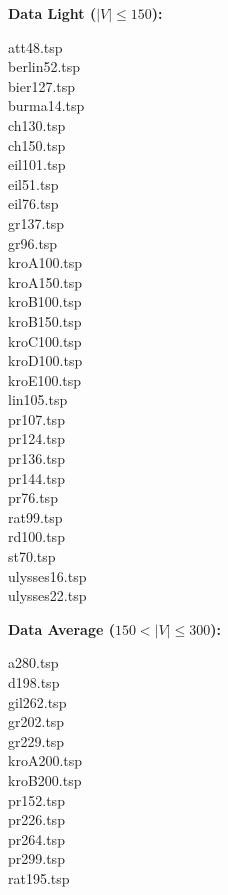\documentclass[11pt, english, openany]{report}
\begin{document}
\begin{appendices}
		\textbf{Data Light ($ |V| \le 150 $):}
		\begin{multicols}{5}
			att48.tsp \\
			berlin52.tsp \\
			bier127.tsp \\
			burma14.tsp \\
			ch130.tsp \\
			ch150.tsp \\
			eil101.tsp \\
			eil51.tsp \\
			eil76.tsp \\
			gr137.tsp \\
			gr96.tsp \\
			kroA100.tsp \\
			kroA150.tsp \\
			kroB100.tsp \\
			kroB150.tsp \\
			kroC100.tsp \\
			kroD100.tsp \\
			kroE100.tsp \\
			lin105.tsp \\
			pr107.tsp \\
			pr124.tsp \\
			pr136.tsp \\
			pr144.tsp \\
			pr76.tsp \\
			rat99.tsp \\
			rd100.tsp \\
			st70.tsp \\
			ulysses16.tsp \\
			ulysses22.tsp \\
		\end{multicols}
		\textbf{Data Average ($ 150 < |V| \le 300 $):}
		\begin{multicols}{5}
				a280.tsp \\
				d198.tsp \\
				gil262.tsp \\
				gr202.tsp \\
				gr229.tsp \\
				kroA200.tsp \\
				kroB200.tsp \\
				pr152.tsp \\
				pr226.tsp \\
				pr264.tsp \\
				pr299.tsp \\
				rat195.tsp \\

\end{multicols}
\end{appendices}
\end{document}
